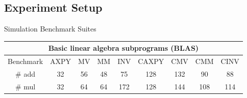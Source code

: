\documentclass{beamer}
\begin{document}
\begin{CJK}{UTF8}{bkai}
            \subsection{Experiment Setup}
            \begin{frame}{Simulation Benchmark Suites}
                \begin{table}[!ht]
                    \centering
                    \resizebox{\columnwidth}{!}
                    {
                        \begin{tabular}{|c|c|c|c|c|c|c|c|c|}
                            \hline
                            \multicolumn{9}{|c|}{\textbf{Basic linear algebra subprograms (BLAS)}} \\ \hline
                            Benchmark              & AXPY   & MV     & MM      & INV      & CAXPY  & CMV  & CMM    & CINV  \\ \hline
                            \# add            &  32    &  56    &   48    &    75    &  128   & 132  &   90   &  88   \\ \hline
                            \# mul            &  32    &  64    &   64    &   172    &  128   & 144  &  108   & 114   \\ \hline

\end{tabular}}
\end{table}
\end{frame}
\end{CJK}
\end{document}
